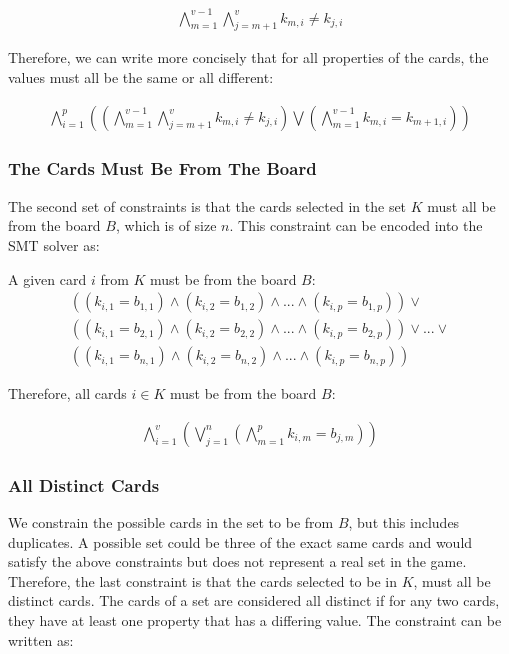 \documentclass[pageno]{jpaper}
\begin{document}
\begin{align}
	\bigwedge \limits_{m=1}^{v-1}  \bigwedge \limits_{j = m+1}^{v} k_{m,i} \neq k_{j,i}
\end{align}


Therefore, we can write more concisely that for all properties of the cards, the values must all be the same or all different:

\begin{align}
	\bigwedge \limits_{i=1}^{p}  \left(  \left( \bigwedge \limits_{m=1}^{v-1}  \bigwedge \limits_{j = m+1}^{v} k_{m,i} \neq k_{j,i} \right)  \bigvee  	 \left(  \bigwedge \limits_{m=1}^{v-1} k_{m,i} = k_{m+1,i} \right) \right)
\end{align}


\subsubsection{The Cards Must Be From The Board}

The second set of constraints is that the cards selected in the set $K$ must all be from the board $B$, which is of size $n$. This constraint can be encoded into the SMT solver as:

A given card $i$ from $K$ must be from the board $B$:
\begin{multline}
	((k_{i,1} = b_{1,1}) \wedge (k_{i,2} = b_{1,2}) \wedge ... \wedge (k_{i,p} = b_{1,p})) \vee \\
	 ((k_{i,1} = b_{2,1}) \wedge (k_{i,2} = b_{2,2}) \wedge ... \wedge (k_{i,p} = b_{2,p}))  \vee ... \vee \\ ((k_{i,1} = b_{n,1}) \wedge (k_{i,2} = b_{n,2}) \wedge ... \wedge (k_{i,p} = b_{n,p})) 
\end{multline}

Therefore, all cards $i \in K$ must be from the board $B$:
 
\begin{align}
	\bigwedge \limits_{i=1}^{v}  \left( \bigvee \limits_{j = 1}^{n}  \left( \bigwedge \limits_{m=1}^{p}  k_{i,m} = b_{j,m}\right) \right)
\end{align}

\subsubsection{All Distinct Cards}

We constrain the possible cards in the set to be from $B$, but this includes duplicates. A possible set could be three of the exact same cards and would satisfy the above constraints but does not represent a real set in the game. Therefore, the last constraint is that the cards selected to be in $K$, must all be distinct cards. The cards of a set are considered all distinct if for any two cards, they have at least one property that has a differing value. The constraint can be written as:
\end{document}
